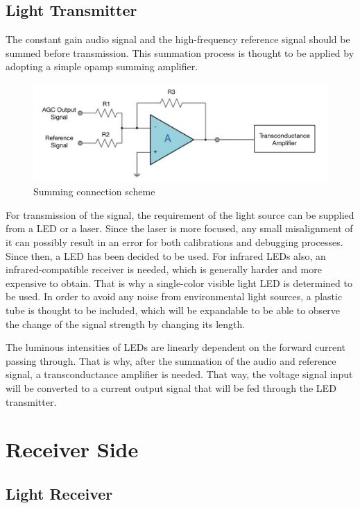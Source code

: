 \documentclass[a4paper,10pt]{IEEEtran}
\begin{document}
\subsection{Light Transmitter}

The constant gain audio signal and the high-frequency reference signal should be summed before transmission. This summation process is thought to be applied by adopting a simple opamp summing amplifier.     
\begin{figure}[htbp!]
    \centering
    \includegraphics[width = 1\linewidth]{transconductance.jpeg}
    \caption{Summing connection scheme }
\end{figure} 
For transmission of the signal, the requirement of the light source can be supplied from a LED or a laser. Since the laser is more focused, any small misalignment of it can possibly result in an error for both calibrations and debugging processes. Since then, a LED has been decided to be used. For infrared LEDs also, an infrared-compatible receiver is needed, which is generally harder and more expensive to obtain. That is why a single-color visible light LED is determined to be used. In order to avoid any noise from environmental light sources, a plastic tube is thought to be included, which will be expandable to be able to observe the change of the signal strength by changing its length. 

The luminous intensities of LEDs are linearly dependent on the forward current passing through. That is why, after the summation of the audio and reference signal, a transconductance amplifier is needed. That way, the voltage signal input will be converted to a current output signal that will be fed through the LED transmitter.
\vspace{-0.45cm}
\section{Receiver Side}
\vspace{-0.1cm}
\subsection{Light Receiver}
\end{document}
